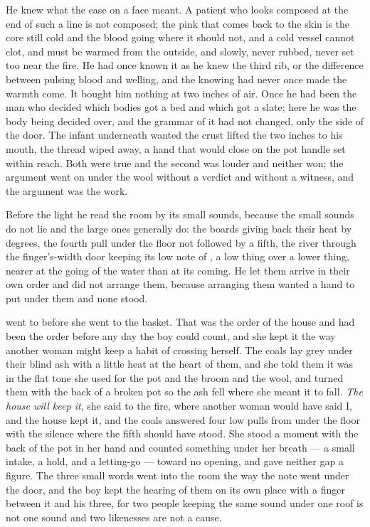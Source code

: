 He knew what the ease on a face meant. A patient who looks composed at the end of such a line is not composed; the pink that comes back to the skin is the core still cold and the blood going where it should not, and a cold vessel cannot clot, and must be warmed from the outside, and slowly, never rubbed, never set too near the fire. He had once known it as he knew the third rib, or the difference between pulsing blood and welling, and the knowing had never once made the warmth come. It bought him nothing at two inches of air. Once he had been the man who decided which bodies got a bed and which got a slate; here he was the body being decided over, and the grammar of it had not changed, only the side of the door. The infant underneath wanted the crust lifted the two inches to his mouth, the thread wiped away, a hand that would close on the pot handle set within reach. Both were true and the second was louder and neither won; the argument went on under the wool without a verdict and without a witness, and the argument was the work.

Before the light he read the room by its small sounds, because the small sounds do not lie and the large ones generally do: the boards giving back their heat by degrees, the fourth pull under the floor not followed by a fifth, the river through the finger's-width door keeping its low note of , a low thing over a lower thing, nearer at the going of the water than at its coming. He let them arrive in their own order and did not arrange them, because arranging them wanted a hand to put under them and none stood.

\scenebreak

 went to  before she went to the basket. That was the order of the house and had been the order before any day the boy could count, and she kept it the way another woman might keep a habit of crossing herself. The coals lay grey under their blind ash with a little heat at the heart of them, and she told them it was  in the flat tone she used for the pot and the broom and the wool, and turned them with the back of a broken pot so the ash fell where she meant it to fall. \emph{The house will keep it}, she said to the fire, where another woman would have said I, and the house kept it, and the coals answered four low pulls from under the floor with the silence where the fifth should have stood. She stood a moment with the back of the pot in her hand and counted something under her breath --- a small intake, a hold, and a letting-go --- toward no opening, and gave neither gap a figure. The three small words went into the room the way the note went under the door, and the boy kept the hearing of them on its own place with a finger between it and his three, for two people keeping the same sound under one roof is not one sound and two likenesses are not a cause.

